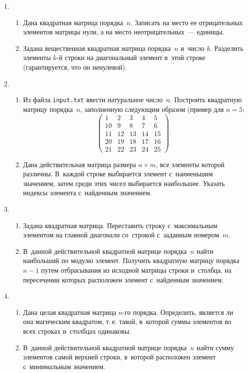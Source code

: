 \documentclass{article}
\begin{document}
\begin{enumerate}[label={}, leftmargin=0pt, itemindent=0pt]
\item
\begin{enumerate}[label=\arabic{enumi}.\arabic*.] %
  \item
  Дана квадратная матрица порядка~$n$. Записать на место ее отрицательных элементов матрицы нули, а на место неотрицательных~— единицы. 
  \item
  Задана вещественная квадратная матрица порядка~$n$ и~число $k$. Разделить элементы $k$-й строки на диагональный элемент в~этой строке (гарантируется, что он ненулевой).
\end{enumerate}

\item
\begin{enumerate}[label=\arabic{enumi}.\arabic*.] %
\item
  Из файла \texttt{input.txt} ввести натуральное число~$n$. Построить квадратную матрицу порядка~$n$, заполненную следующим образом (пример для $n=5$:
  \[
  \left(
  \begin{array}{ccccc}
  1 & 2 & 3 &  4 &  5\\
  10 & 9 & 8 &  7 &  6\\
  11 & 12 & 13 &  14 &  15\\
  20 & 19 & 18 &  17 &  16\\
  21 & 22 & 23 &  24 &  25
  \end{array}
  \right).
  \]
  \item
  Дана действительная матрица размера $n × m$, все элементы которой различны. В~каждой строке выбирается элемент с~наименьшим значением, затем среди этих чисел выбирается наибольшее. Указать индексы элемента с~найденным значением.
\end{enumerate}

\item
\begin{enumerate}[label=\arabic{enumi}.\arabic*.] %
  \item
  Задана квадратная матрица. Переставить строку с~максимальным элементом на главной диагонали со~строкой с~заданным номером~$m$.
  \item
  В~данной действительной квадратной матрице порядка~$n$ найти наибольший по модулю элемент. Получить квадратную матрицу порядка $n-1$ путем отбрасывания из исходной матрицы строки и~столбца, на пересечении которых расположен элемент с~найденным значением.
\end{enumerate}

\item
\begin{enumerate}[label=\arabic{enumi}.\arabic*.] %
  \item
  Дана целая квадратная матрица $n$-го порядка. Определить, является ли она магическим квадратом, т.\,е. такой, в~которой суммы элементов во всех строках и~столбцах одинаковы.
  \item
  В~данной действительной квадратной матрице порядка~$n$ найти сумму элементов самой верхней строки, в~которой расположен элемент с~минимальным значением.
\end{enumerate}

\end{enumerate}
\end{document}
